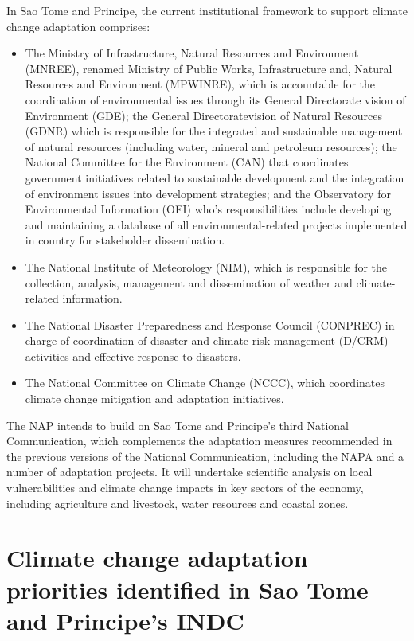 \documentclass[
]{book}
\providecommand{\tightlist}{%
  \setlength{\itemsep}{0pt}\setlength{\parskip}{0pt}}
\begin{document}
In Sao Tome and Principe, the current institutional framework to support climate change adaptation comprises:

\begin{itemize}
\tightlist
\item
  The Ministry of Infrastructure, Natural Resources and Environment (MNREE), renamed Ministry of Public Works, Infrastructure and, Natural Resources and Environment (MPWINRE), which is accountable for the coordination of environmental issues through its General Directorate vision of Environment (GDE); the General Directoratevision of Natural Resources (GDNR) which is responsible for the integrated and sustainable management of natural resources (including water, mineral and petroleum resources); the National Committee for the Environment (CAN) that coordinates government initiatives related to sustainable development and the integration of environment issues into development strategies; and the Observatory for Environmental Information (OEI) who's responsibilities include developing and maintaining a database of all environmental-related projects implemented in country for stakeholder dissemination.\\
\item
  The National Institute of Meteorology (NIM), which is responsible for the collection, analysis, management and dissemination of weather and climate-related information.
\item
  The National Disaster Preparedness and Response Council (CONPREC) in charge of coordination of disaster and climate risk management (D/CRM) activities and effective response to disasters.
\item
  The National Committee on Climate Change (NCCC), which coordinates climate change mitigation and adaptation initiatives.
\end{itemize}

The NAP intends to build on Sao Tome and Principe's third National Communication, which complements the adaptation measures recommended in the previous versions of the National Communication, including the NAPA and a number of adaptation projects. It will undertake scientific analysis on local vulnerabilities and climate change impacts in key sectors of the economy, including agriculture and livestock, water resources and coastal zones.

\hypertarget{climate-change-adaptation-priorities-identified-in-sao-tome-and-principes-indc}{%
\section{Climate change adaptation priorities identified in Sao Tome and Principe's INDC}\label{climate-change-adaptation-priorities-identified-in-sao-tome-and-principes-indc}}
\end{document}

